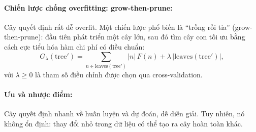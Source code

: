 \paragraph{Chiến lược chống overfitting: grow-then-prune:}
Cây quyết định rất dễ overfit. Một chiến lược phổ biến là ``trồng rồi tỉa'' (grow-then-prune): đầu tiên phát triển một cây lớn, sau đó tìm cây con tối ưu bằng cách cực tiểu hóa hàm chi phí có điều chuẩn:
\begin{equation}
    G_{\lambda}(\text{tree}') = \sum_{n\in\text{leaves}(\text{tree}')}|n|\,F(n)
                              + \lambda\,|\text{leaves}(\text{tree}')|,
    \label{eq:pruning}
\end{equation}
với $\lambda\geq 0$ là tham số điều chỉnh được chọn qua cross-validation.

\paragraph{Ưu và nhược điểm:}
Cây quyết định nhanh về huấn luyện và dự đoán, dễ diễn giải. Tuy nhiên, nó không ổn định: thay đổi nhỏ trong dữ liệu có thể tạo ra cây hoàn toàn khác. 


